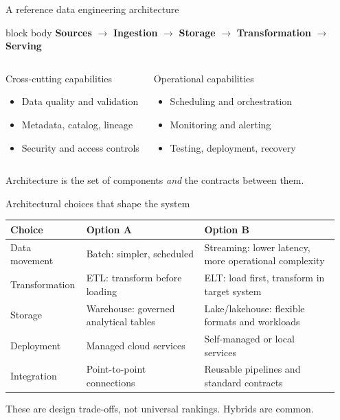 \documentclass[aspectratio=43,10pt]{beamer}
\begin{document}
\begin{frame}{A reference data engineering architecture}
\centering
\begin{beamercolorbox}[wd=1.0\linewidth,sep=.5em,center,rounded=true]{block body}
\textbf{Sources} $\rightarrow$ \textbf{Ingestion} $\longrightarrow$
\textbf{Storage} $\rightarrow$ \textbf{Transformation} $\longrightarrow$
\textbf{Serving}
\end{beamercolorbox}
\vspace{1em}
\begin{columns}[T]
\begin{block}{Cross-cutting capabilities}
\begin{itemize}
  \item Data quality and validation
  \item Metadata, catalog, lineage
  \item Security and access controls
\end{itemize}
\end{block}
\begin{block}{Operational capabilities}
\begin{itemize}
  \item Scheduling and orchestration
  \item Monitoring and alerting
  \item Testing, deployment, recovery
\end{itemize}
\end{block}
\end{columns}
\vspace{0.5em}
\small Architecture is the set of components \emph{and} the contracts between them.
\end{frame}

\begin{frame}{Architectural choices that shape the system}
\footnotesize
\begin{tabular}{@{}p{0.2\linewidth}p{0.35\linewidth}p{0.4\linewidth}@{}}
\toprule
\textbf{Choice} & \textbf{Option A} & \textbf{Option B} \\
\midrule
Data movement & Batch: simpler, scheduled & Streaming: lower latency, more operational complexity \\
Transformation & ETL: transform before loading & ELT: load first, transform in target system \\
Storage & Warehouse: governed analytical tables & Lake/lakehouse: flexible formats and workloads \\
Deployment & Managed cloud services & Self-managed or local services \\
Integration & Point-to-point connections & Reusable pipelines and standard contracts \\
\bottomrule
\end{tabular}

\vspace{0.8em}
\small These are design trade-offs, not universal rankings. Hybrids are common.
\end{frame}
\end{document}
